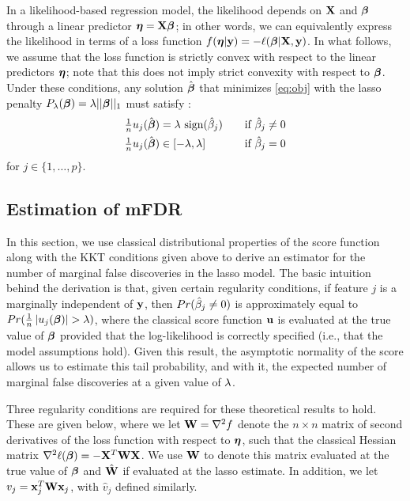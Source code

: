 In a likelihood-based regression model, the likelihood depends on $\mathbf{X}$ and $\boldsymbol{\beta}$ through a linear predictor $\boldsymbol{\eta} = \mathbf{X}\boldsymbol{\beta}$; in other words, we can equivalently express the likelihood in terms of a loss function $f(\boldsymbol{\eta}|\mathbf{y})=-\ell(\boldsymbol{\beta}|\mathbf{X},\mathbf{y})$.
In what follows, we assume that the loss function is strictly convex with respect to the linear predictors $\boldsymbol{\eta}$; note that this does not imply strict convexity with respect to $\boldsymbol{\beta}$.
Under these conditions, any solution $\hat{\boldsymbol{\beta}}$ that minimizes \eqref{eq:obj} with the lasso penalty $P_{\lambda} (\boldsymbol{\beta}) = \lambda||\boldsymbol{\beta}||_1$ must satisfy \citep{lasso_kkt}:
\begin{alignat*}{2}
  \tfrac{1}{n}u_j(\hat{\boldsymbol{\beta}}) &= \lambda \textrm{ sign}(\hat{\beta}_j) &\quad \text{if } \hat{\beta}_j &\neq 0 \\
  \tfrac{1}{n}u_j(\hat{\boldsymbol{\beta}}) &\in [-\lambda,\lambda]  &\quad \text{if }  \hat{\beta}_j &= 0
\end{alignat*}
for $j \in \{1, \ldots, p\}$.


\subsection{Estimation of mFDR}

In this section, we use classical distributional properties of the score function along with the KKT conditions given above to derive an estimator for the number of marginal false discoveries in the lasso model.
The basic intuition behind the derivation is that, given certain regularity conditions, if feature $j$ is a marginally independent of $\mathbf{y}$, then $Pr(\hat{\beta}_j \neq 0)$ is approximately equal to $Pr(\tfrac{1}{n}\left\lvert u_j(\boldsymbol{\beta})\right\rvert > \lambda)$, where the classical score function $\mathbf{u}$ is evaluated at the true value of $\boldsymbol{\beta}$ provided that the log-likelihood is correctly specified (i.e., that the model assumptions hold).
Given this result, the asymptotic normality of the score allows us to estimate this tail probability, and with it, the expected number of marginal false discoveries at a given value of $\lambda$.

Three regularity conditions are required for these theoretical results to hold.  These are given below, where we let $\mathbf{W} = \nabla^2f$ denote the $n \times n$ matrix of second derivatives of the loss function with respect to $\boldsymbol{\eta}$, such that the classical Hessian matrix $\nabla^2 \ell (\boldsymbol{\beta}) = -\mathbf{X}^T\mathbf{W}\mathbf{X}$.  We use $\mathbf{W}$ to denote this matrix evaluated at the true value of $\boldsymbol{\beta}$ and $\hat{\mathbf{W}}$ if evaluated at the lasso estimate.  In addition, we let $v_j=\mathbf{x}_j^T\mathbf{W}\mathbf{x}_j$, with $\hat{v}_j$ defined similarly.

